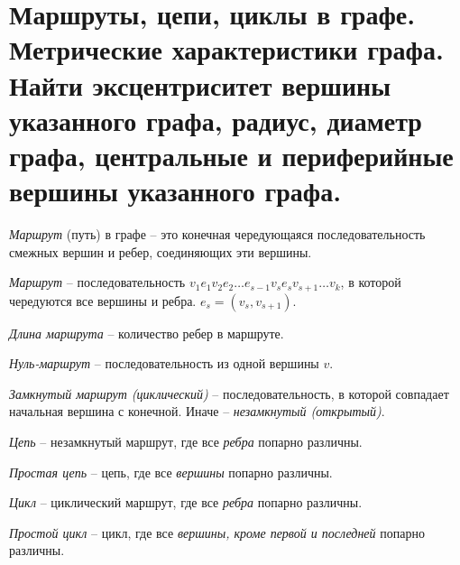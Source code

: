\section{Маршруты, цепи, циклы в графе. Метрические характеристики графа. Найти эксцентриситет 
вершины указанного графа, радиус, диаметр графа, центральные и периферийные вершины 
указанного графа.}

\begin{definition}
    \textit{Маршрут} (путь) в графе -- это конечная чередующаяся
    последовательность смежных вершин и ребер, соединяющих эти вершины.
\end{definition}

\textit{Маршрут} -- последовательность $v_1e_1v_2e_2 \dots e_{s-1}v_se_sv_{s+1} \dots v_k$,
в которой чередуются все вершины и ребра. $e_s=(v_s,v_{s+1})$.

\begin{definition}
    \textit{Длина маршрута} -- количество ребер в маршруте.
\end{definition}

\begin{definition}
    \textit{Нуль-маршрут} -- последовательность из одной вершины $v$.
\end{definition}

\begin{definition}
    \textit{Замкнутый маршрут (циклический)} -- последовательность, в которой
    совпадает начальная вершина с конечной. Иначе -- \textit{незамкнутый (открытый)}.
\end{definition}

\begin{definition}
    \textit{Цепь} -- незамкнутый маршрут, где все \textit{ребра} попарно различны.
\end{definition}

\begin{definition}
    \textit{Простая цепь} -- цепь, где все \textit{вершины} попарно различны.
\end{definition}

\begin{definition}
    \textit{Цикл} -- циклический маршрут, где все \textit{ребра} попарно различны.
\end{definition}

\begin{definition}
    \textit{Простой цикл} -- цикл, где все \textit{вершины, кроме первой и последней} попарно различны.
\end{definition}

